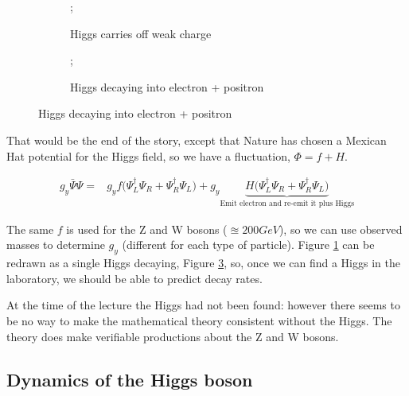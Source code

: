 \documentclass[]{article}
\begin{document}
\begin{figure}[H]
	\caption[Higgs interacting with Fermions]{Higgs interacting with Fermions: two forms of the same diagram}
	\begin{subfigure}[t]{0.45\textwidth}
		\caption{Higgs carries off weak charge}\label{fig:2-10-Higgs-emitted}
		;
	\end{subfigure}
	\begin{subfigure}[t]{0.45\textwidth}
		\caption{Higgs decaying into electron + positron}\label{fig:2-10-Higgs-decaying}
		;
	\end{subfigure}
\end{figure}

That would be the end of the story, except that Nature has chosen a Mexican Hat potential for the Higgs field, so we have a fluctuation, $\Phi=f+H$.

\begin{align*}
g_y \bar{\Psi}\Psi =& g_y f \big(\Psi^\dagger_L  \Psi_R +  \Psi^\dagger_R \Psi_L  \big) + g_y\underbrace{ H \big(\Psi^\dagger_L  \Psi_R +  \Psi^\dagger_R \Psi_L  \big)}_\text{Emit electron and re-emit it plus Higgs}
\end{align*}

The same $f$ is used for the Z and W bosons ($\approxeq200GeV$), so we can use observed masses to determine $g_y$ (different for each type of particle). Figure \ref{fig:2-10-Higgs-emitted} can be redrawn as a single Higgs decaying, Figure \ref{fig:2-10-Higgs-decaying}, so, once we can find a Higgs in the laboratory, we should be able to predict decay rates.

At the time of the lecture the Higgs had not been found: however there seems to be no way to make the mathematical theory consistent without the Higgs. The theory does make verifiable productions about the Z and W bosons.


\subsection{Dynamics of the Higgs boson}
\end{document}
